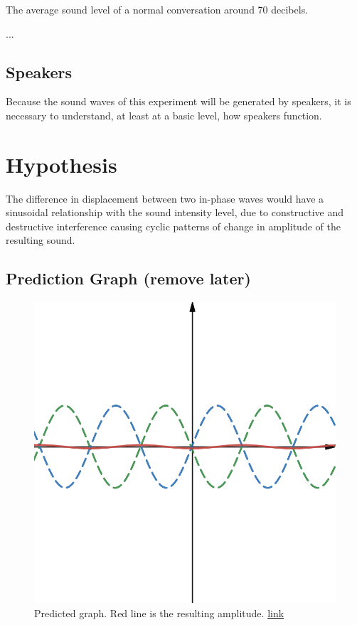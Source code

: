 \documentclass[index]{subfiles}
\begin{document}
The average sound level of a normal conversation around 70 decibels.

...

\subsection{Speakers}

Because the sound waves of this experiment will be generated by speakers, it is necessary to understand, at least at a basic level, how speakers function. \cite{speakers}

\section{Hypothesis}

The difference in displacement between two in-phase waves would have a sinusoidal relationship with the sound intensity level, due to constructive and destructive interference causing cyclic patterns of change in amplitude of the resulting sound.

\subsection{Prediction Graph (remove later)}


\begin{figure}[H]
    \centering
    \includegraphics[scale=0.3]{prediction.png}
    \caption{Predicted graph. Red line is the resulting amplitude. \href{https://www.desmos.com/calculator/ahmohu46il}{link}}
\end{figure}
\end{document}
